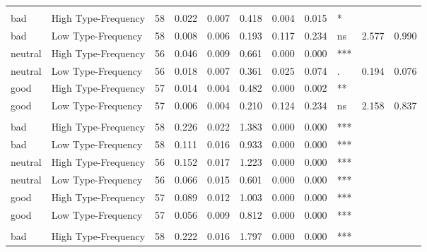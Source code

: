 \documentclass[
]{article}
\begin{document}
\begin{longtable}[t]{llrrrrrrlrr}
\endfoot
\bottomrule
\endlastfoot
\addlinespace[0.3em]
\multicolumn{11}{l}{\textbf{First Party Acceptability}}\\
\hspace{1em}bad & High Type-Frequency & 58 & 0.022 & 0.007 & 0.418 & 0.004 & 0.015 & * &  & \\
\hspace{1em}bad & Low Type-Frequency & 58 & 0.008 & 0.006 & 0.193 & 0.117 & 0.234 & ns & 2.577 & 0.990\\
\hspace{1em}neutral & High Type-Frequency & 56 & 0.046 & 0.009 & 0.661 & 0.000 & 0.000 & *** &  & \\
\hspace{1em}neutral & Low Type-Frequency & 56 & 0.018 & 0.007 & 0.361 & 0.025 & 0.074 & . & 0.194 & 0.076\\
\hspace{1em}good & High Type-Frequency & 57 & 0.014 & 0.004 & 0.482 & 0.000 & 0.002 & ** &  & \\
\hspace{1em}good & Low Type-Frequency & 57 & 0.006 & 0.004 & 0.210 & 0.124 & 0.234 & ns & 2.158 & 0.837\\
\addlinespace[0.3em]
\multicolumn{11}{l}{\textbf{Third Party Acceptability}}\\
\hspace{1em}bad & High Type-Frequency & 58 & 0.226 & 0.022 & 1.383 & 0.000 & 0.000 & *** &  & \\
\hspace{1em}bad & Low Type-Frequency & 58 & 0.111 & 0.016 & 0.933 & 0.000 & 0.000 & *** &  & \\
\hspace{1em}neutral & High Type-Frequency & 56 & 0.152 & 0.017 & 1.223 & 0.000 & 0.000 & *** &  & \\
\hspace{1em}neutral & Low Type-Frequency & 56 & 0.066 & 0.015 & 0.601 & 0.000 & 0.000 & *** &  & \\
\hspace{1em}good & High Type-Frequency & 57 & 0.089 & 0.012 & 1.003 & 0.000 & 0.000 & *** &  & \\
\hspace{1em}good & Low Type-Frequency & 57 & 0.056 & 0.009 & 0.812 & 0.000 & 0.000 & *** &  & \\
\addlinespace[0.3em]
\multicolumn{11}{l}{\textbf{Prevalence}}\\
\hspace{1em}bad & High Type-Frequency & 58 & 0.222 & 0.016 & 1.797 & 0.000 & 0.000 & *** &  & \\

\end{longtable}
\end{document}
